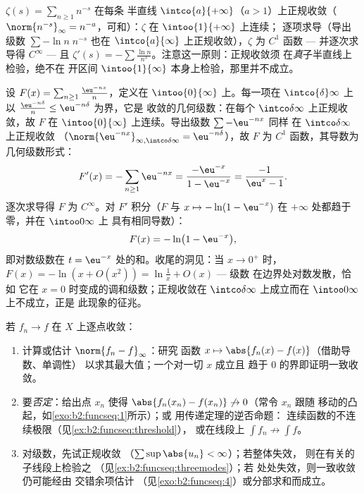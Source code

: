 \begin{example}[黎曼 $\zeta$ 函数]\label{ex:b2:funcseq:zeta}
$\zeta(s) = \sum_{n\geq1} n^{-s}$ 在每条
半直线 $\intco{a}{+\infty}$（$a > 1$）上正规收敛（$\norm{n^{-s}}_\infty =
n^{-a}$，可和）：$\zeta$ 在 $\intoo{1}{+\infty}$ 上连续；
逐项求导（导出级数 $\sum -\ln n\; n^{-s}$
也在 $\intco{a}{\infty}$ 上正规收敛），$\zeta$ 为 $C^1$ 函数
--- 并逐次求导得 $C^\infty$ --- 且 $\zeta'(s) = -\sum \frac{\ln
n}{n^s}$。注意这一原则：正规收敛须
在\emph{真}子半直线上检验，绝不在
开区间 $\intoo{1}{\infty}$ 本身上检验，那里并不成立。
\end{example}

\begin{example}[一个对数级数的完整计算]\label{ex:b2:funcseq:logseries}
设 $F(x) = \sum_{n\geq1} \frac{\eu^{-nx}}{n}$，定义在
$\intoo{0}{\infty}$ 上。每一项在 $\intco{\delta}
\infty$ 上以 $\frac{\eu^{-n\delta}}{n} \leq \eu^{-n\delta}$ 为界，它是
收敛的几何级数：在每个
$\intco\delta\infty$ 上正规收敛，故 $F$ 在
$\intoo{0}{\infty}$ 上连续。导出级数 $\sum -\eu^{-nx}$ 同样
在 $\intco\delta\infty$ 上正规收敛
（$\norm{\eu^{-nx}}_{\infty,\intco\delta\infty} =
\eu^{-n\delta}$），故 $F$ 为 $C^1$ 函数，其导数为几何级数形式：
\[
F'(x) = -\sum_{n\geq1}\eu^{-nx}
= \frac{-\eu^{-x}}{1 - \eu^{-x}}
= \frac{-1}{\eu^{x} - 1} .
\]
逐次求导得 $F$ 为 $C^\infty$。对 $F'$ 积分（$F$ 与 $x
\mapsto -\ln(1 - \eu^{-x})$ 在 $+\infty$ 处都趋于零，并在 $\intoo0\infty$ 上
具有相同导数）：
\[
F(x) = -\ln\bigl(1 - \eu^{-x}\bigr),
\]
即对数级数在 $t = \eu^{-x}$ 处的和。收尾的洞见：当 $x
\to 0^+$ 时，$F(x) = -\ln(x + O(x^2)) = \ln\frac1x + O(x)$ --- 级数
在边界处对数发散，恰如
它在 $x = 0$ 时变成的调和级数；正规收敛在
$\intco\delta\infty$ 上成立而在 $\intoo0\infty$ 上不成立，正是
此现象的征兆。
\end{example}

\begin{method}[证明或否定一致收敛]\label{met:b2:funcseq:uniform}
若 $f_n \to f$ 在 $X$ 上逐点收敛：
\begin{enumerate}
  \item 计算或估计 $\norm{f_n - f}_\infty$：研究
        函数 $x \mapsto \abs{f_n(x) - f(x)}$（借助导数、单调性）
        以求其最大值；一个对一切 $x$ 成立且
        趋于 $0$ 的界即证明一致收敛。
  \item 要\emph{否定}：给出点 $x_n$ 使得
        $\abs{f_n(x_n) - f(x_n)} \not\to 0$（常令 $x_n$ 跟随
        移动的凸起，如\cref{exo:b2:funcseq:1}所示）；或
        用传递定理的逆否命题：
        连续函数的不连续极限（见\cref{ex:b2:funcseq:threshold}），
        或在线段上 $\int f_n
        \not\to \int f$。
  \item 对级数，先试正规收敛
        （$\sum\sup\abs{u_n} < \infty$）；若整体失效，
        则在有关的子线段上检验之
        （见\cref{ex:b2:funcseq:threemodes}）；若
        处处失效，则一致收敛仍可能经由
        交错余项估计
        （见\cref{exo:b2:funcseq:4}）或分部求和而成立。
\end{enumerate}
\end{method}

